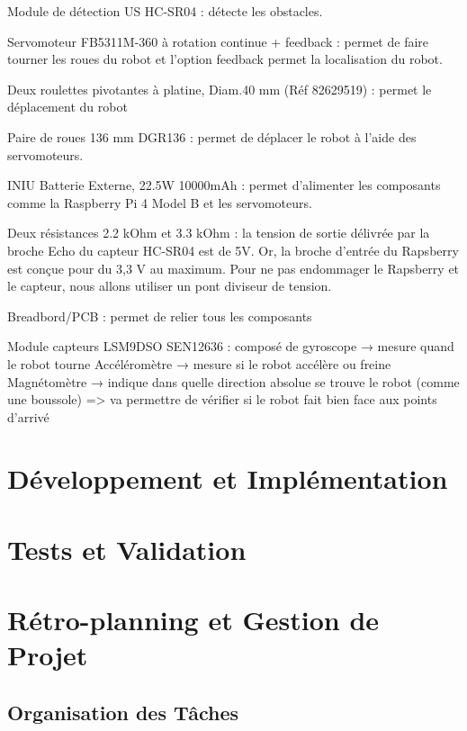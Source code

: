 \documentclass[a4paper,12pt]{report}  %
\begin{document}
	Module de détection US HC-SR04 : détecte les obstacles.

	Servomoteur FB5311M-360 à rotation continue + feedback : permet de faire tourner les roues du robot et l'option feedback permet la localisation du robot.

	Deux roulettes pivotantes à platine, Diam.40 mm (Réf 82629519) : permet le déplacement du robot

	Paire de roues 136 mm DGR136 : permet de déplacer le robot à l'aide des servomoteurs.

	INIU Batterie Externe, 22.5W 10000mAh : permet d'alimenter les composants comme la Raspberry Pi 4 Model B et les servomoteurs.

	Deux résistances 2.2 kOhm et 3.3 kOhm : la tension de sortie délivrée par la broche Echo du capteur HC-SR04 est de 5V. 
	Or, la broche d'entrée du Rapsberry est conçue pour du 3,3 V au maximum. Pour ne pas endommager le Rapsberry et le capteur, nous allons utiliser un pont diviseur de tension.


	Breadbord/PCB : permet de relier tous les composants

	Module capteurs LSM9DSO SEN12636 : composé de gyroscope → mesure quand le robot tourne
	Accéléromètre → mesure si le robot accélère ou freine
	Magnétomètre → indique dans quelle direction absolue se trouve le robot (comme une boussole) 
	=> va permettre de vérifier si le robot fait bien face aux points d’arrivé




	
	\section{Développement et Implémentation}
	
	\section{Tests et Validation}
	
	\section{Rétro-planning et Gestion de Projet}
	\subsection{Organisation des Tâches}
	
\end{document}
